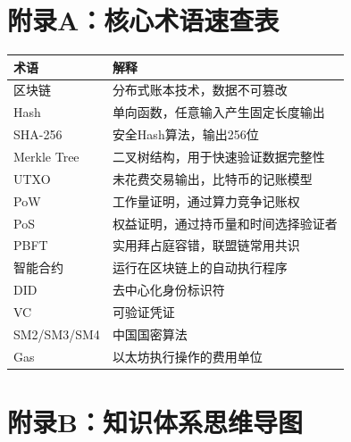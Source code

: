 ﻿\documentclass[12pt,a4paper]{article}
\begin{document}
\section{附录A：核心术语速查表}

\begin{center}
\begin{tabular}{|p{3cm}|p{10cm}|}
\hline
\rowcolor{LightBG}
\textbf{术语} & \textbf{解释} \\
\hline
区块链 & 分布式账本技术，数据不可篡改 \\
\hline
Hash & 单向函数，任意输入产生固定长度输出 \\
\hline
SHA-256 & 安全Hash算法，输出256位 \\
\hline
Merkle Tree & 二叉树结构，用于快速验证数据完整性 \\
\hline
UTXO & 未花费交易输出，比特币的记账模型 \\
\hline
PoW & 工作量证明，通过算力竞争记账权 \\
\hline
PoS & 权益证明，通过持币量和时间选择验证者 \\
\hline
PBFT & 实用拜占庭容错，联盟链常用共识 \\
\hline
智能合约 & 运行在区块链上的自动执行程序 \\
\hline
DID & 去中心化身份标识符 \\
\hline
VC & 可验证凭证 \\
\hline
SM2/SM3/SM4 & 中国国密算法 \\
\hline
Gas & 以太坊执行操作的费用单位 \\
\hline
\end{tabular}
\end{center}

\section{附录B：知识体系思维导图}
\end{document}
